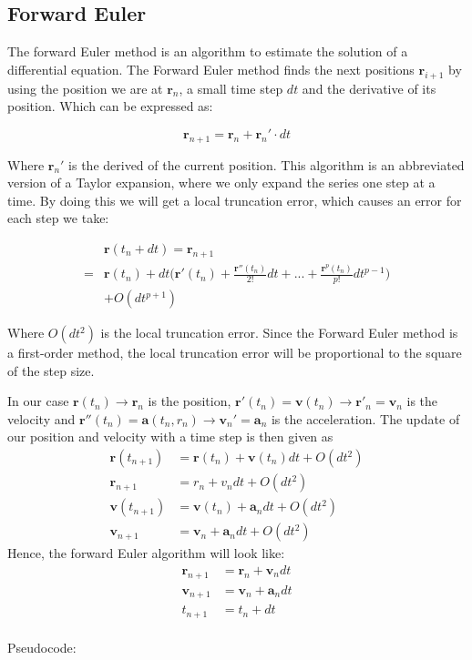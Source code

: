 \documentclass{article}
\begin{document}
\subsection{Forward Euler}
The forward Euler method is an algorithm to estimate the solution of a differential equation. The Forward Euler method  finds the next positions $\mathbf{r}_{i+1}$ by using the position we are at $\mathbf{r}_{n}$, a small time step $dt$ and the derivative of its position. Which can be expressed as:

\begin{equation}
\mathbf{r}_{n+1}=\mathbf{r}_n + \mathbf{r}_n'\cdot dt
\label{eq:yn1}
\end{equation}

Where $\mathbf{r}_n'$ is the derived of the current position. This algorithm is an abbreviated version of a Taylor expansion, where we only expand the series one step at a time. By doing this we will get a local truncation error, which causes an error for each step we take:

\begin{equation}
\begin{split}
&\mathbf{r}(t_n+dt)=\mathbf{r}_{n+1}\\
=&\mathbf{r}(t_n)+dt\bigg(\mathbf{r}'(t_n) + \frac{\mathbf{r}''(t_n)}{2!}dt + ... + \frac{\mathbf{r}^p(t_n)}{p!}dt^{p-1}\bigg) \\
&+ O(dt^{p+1})
\end{split}
\label{eq:ytndt}
\end{equation} 

Where $O(dt^2)$ is the local truncation error. Since the Forward Euler method is a first-order method, the local truncation error will be proportional to the square of the step size.

In our case $\mathbf{r}(t_n) \rightarrow \mathbf{r}_n$ is the position, $\mathbf{r}'(t_n)=\mathbf{v}(t_n) \rightarrow \mathbf{r}'_n=\mathbf{v}_n$ is the velocity and $\mathbf{r}''(t_n)=\mathbf{a}(t_n,r_n) \rightarrow \mathbf{v}_n'=\mathbf{a}_n$ is the acceleration. The update of our position and velocity with a  time step is then given as  
\begin{align*}
    \mathbf{r}(t_{n+1})&=\mathbf{r}(t_n) + \mathbf{v}(t_n)dt + O(dt^2)\\
    \mathbf{r}_{n+1}&=r_{n} + v_{n}dt + O(dt^2)\\
    \mathbf{v}(t_{n+1})&=\mathbf{v}(t_n)+\mathbf{a}_ndt + O(dt^2)\\
    \mathbf{v}_{n+1}&=\mathbf{v}_n +\mathbf{a}_n dt + O(dt^2)
\end{align*}
Hence, the forward Euler algorithm will look like:
\begin{align*}
    \mathbf{r}_{n+1}&=\mathbf{r}_n+\mathbf{v}_ndt\\
    \mathbf{v}_{n+1}&=\mathbf{v}_n+\mathbf{a}_ndt\\
    t_{n+1}&=t_n + dt
\end{align*}
\\
Pseudocode:
\end{document}
